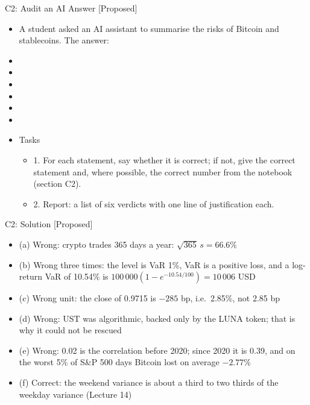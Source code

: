 \begin{frame}{C2: Audit an AI Answer [Proposed]}
\itemsize{\scriptsize}
\begin{itemize}
    \item A student asked an AI assistant to summarise the risks of Bitcoin and stablecoins. The answer:
    \item {}
    \item {}
    \item {}
    \item {}
    \item {}
    \item {}
    \item Tasks
    \begin{itemize}
        \item 1. For each statement, say whether it is correct; if not, give the correct statement and, where possible, the correct number from the notebook (section C2).
        \item 2. Report: a list of six verdicts with one line of justification each.
    \end{itemize}
\end{itemize}
\end{frame}

\ifsolutions
\begin{frame}{C2: Solution [Proposed]}
\itemsize{\footnotesize}
\begin{itemize}
    \item (a) Wrong: crypto trades 365 days a year: $\sqrt{365}\,s = 66.6\%$
    \item (b) Wrong three times: the level is VaR 1\%, VaR is a positive loss, and a log-return VaR of 10.54\% is $100\,000(1 - e^{-10.54/100}) = 10\,006$ USD
    \item (c) Wrong unit: the close of 0.9715 is $-285$ bp, i.e.\ 2.85\%, not 2.85 bp
    \item (d) Wrong: UST was algorithmic, backed only by the LUNA token; that is why it could not be rescued
    \item (e) Wrong: 0.02 is the correlation before 2020; since 2020 it is 0.39, and on the worst 5\% of S\&P 500 days Bitcoin lost on average $-2.77\%$
    \item (f) Correct: the weekend variance is about a third to two thirds of the weekday variance (Lecture 14)
\end{itemize}
\end{frame}
\fi


